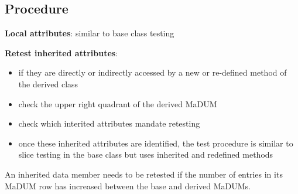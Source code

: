 \documentclass[11pt]{article}
\begin{document}
\subsection{Procedure}
\label{sec:org57821a6}
\textbf{Local attributes}: similar to base class testing

\textbf{Retest inherited attributes}:
\begin{itemize}
\item if they are directly or indirectly accessed by a new or
re-defined method of the derived class
\item check the upper right quadrant of the derived MaDUM
\item check which interited attributes mandate retesting
\item once these inherited attributes are identified, the test procedure is
similar to slice testing in the base class but uses inherited and
redefined methods
\end{itemize}

An inherited data member needs to be retested if the number of entries
in its MaDUM row has increased between the base and derived MaDUMs.
\end{document}
